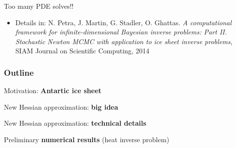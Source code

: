 \documentclass[10pt,final,xcolor=dvipsnames]{beamer}
\begin{document}
\begin{frame}
	\begin{center}
	{\huge Too many PDE solves!!}
	\end{center}
	\vspace{0.05in}
	
	\begin{itemize}
		\item [] \scriptsize{Details in: N. Petra, J. Martin, G. Stadler,
			O. Ghattas. {\em A computational framework for
				infinite-dimensional Bayesian inverse problems: Part
				II. Stochastic Newton MCMC with application to ice sheet inverse
				problems}, SIAM Journal on Scientific Computing, 2014}
	\end{itemize}
	
\end{frame}

\begin{frame}
	\frametitle{Outline}
	{\Large
		\begin{itemize}
			\setlength\itemsep{2em}
			{\color{lightgray}\item Motivation: \textbf{Antartic ice sheet}}
			\item New Hessian approximation: \textbf{big idea}
			{\color{lightgray}\item New Hessian approximation: \textbf{technical details}}
			{\color{lightgray}\item Preliminary \textbf{numerical results} (heat inverse problem)}
		\end{itemize}
	}
\end{frame}
\end{document}

